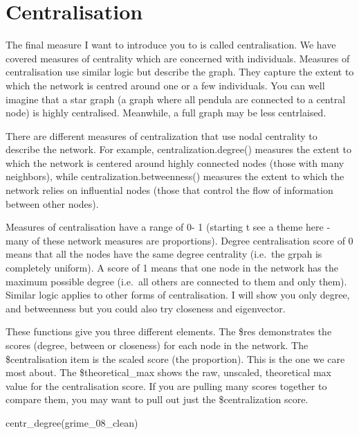 \documentclass[
  letterpaper,
  DIV=11,
  numbers=noendperiod]{scrreprt}
\newenvironment{Shaded}{\begin{snugshade}}{\end{snugshade}}
\newcommand{\FunctionTok}[1]{\textcolor[rgb]{0.28,0.35,0.67}{#1}}
\newcommand{\NormalTok}[1]{\textcolor[rgb]{0.00,0.23,0.31}{#1}}
\begin{document}
\section{Centralisation}\label{centralisation}

The final measure I want to introduce you to is called centralisation.
We have covered measures of centrality which are concerned with
individuals. Measures of centralisation use similar logic but describe
the graph. They capture the extent to which the network is centred
around one or a few individuals. You can well imagine that a star graph
(a graph where all pendula are connected to a central node) is highly
centralised. Meanwhile, a full graph may be less centrlaised.

There are different measures of centralization that use nodal centrality
to describe the network. For example, centralization.degree() measures
the extent to which the network is centered around highly connected
nodes (those with many neighbors), while centralization.betweenness()
measures the extent to which the network relies on influential nodes
(those that control the flow of information between other nodes).

Measures of centralisation have a range of 0- 1 (starting t see a theme
here - many of these network measures are proportions). Degree
centralisation score of 0 means that all the nodes have the same degree
centrality (i.e.~the grpah is completely uniform). A score of 1 means
that one node in the network has the maximum possible degree (i.e.~all
others are connected to them and only them). Similar logic applies to
other forms of centralisation. I will show you only degree, and
betweenness but you could also try closeness and eigenvector.

These functions give you three different elements. The \$res
demonstrates the scores (degree, between or closeness) for each node in
the network. The \$centralisation item is the scaled score (the
proportion). This is the one we care most about. The \$theoretical\_max
shows the raw, unscaled, theoretical max value for the centralisation
score. If you are pulling many scores together to compare them, you may
want to pull out just the \$centralization score.

\begin{Shaded}
\begin{Highlighting}[]
\FunctionTok{centr\_degree}\NormalTok{(grime\_08\_clean)}
\end{Highlighting}
\end{Shaded}
\end{document}
